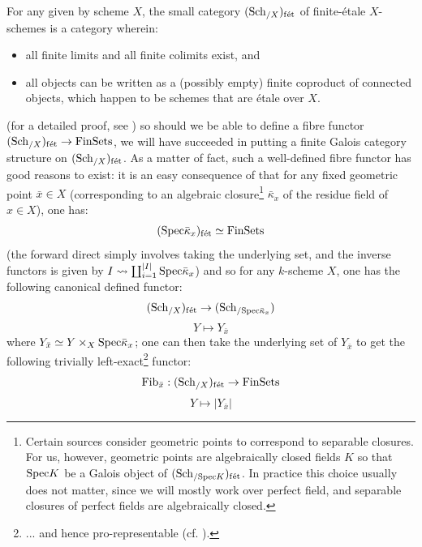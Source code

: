             \begin{remark} \label{remark: finite_etale_schemes}
                For any given by scheme $X$, the small category $(\mathrm{Sch}_{/X})_{\mathrm{f\acute{e}t}}$ of finite-\'etale $X$-schemes is a category wherein:
                    \begin{itemize}
                        \item all finite limits and all finite colimits exist, and
                        \item all objects can be written as a (possibly empty) finite coproduct of connected objects, which happen to be schemes that are \'etale over $X$.  
                    \end{itemize}
                (for a detailed proof, see \cite[\href{https://stacks.math.columbia.edu/tag/0BN9}{Tag 0BN9}]{stacks}) so should we be able to define a fibre functor $(\mathrm{Sch}_{/X})_{\mathrm{f\acute{e}t}} \to \mathrm{Fin}\mathrm{Sets}$, we will have succeeded in putting a finite Galois category structure on $(\mathrm{Sch}_{/X})_{\mathrm{f\acute{e}t}}$. As a matter of fact, such a well-defined fibre functor has good reasons to exist: it is an easy consequence of \cite[\href{https://stacks.math.columbia.edu/tag/00U3}{Tag 00U3}]{stacks} that for any fixed geometric point $\bar{x} \in X$ (corresponding to an algebraic closure\footnote{Certain sources consider geometric points to correspond to separable closures. For us, however, geometric points are algebraically closed fields $K$ so that $\mathrm{Spec} K$ be a Galois object of $(\mathrm{Sch}_{/\mathrm{Spec} K})_{\mathrm{f\acute{e}t}}$. In practice this choice usually does not matter, since we will mostly work over perfect field, and separable closures of perfect fields are algebraically closed.} $\bar{\kappa}_x$ of the residue field of $x \in X$), one has:
                    $$(\mathrm{Spec} \bar{\kappa}_x)_{\mathrm{f\acute{e}t}} \simeq \mathrm{Fin}\mathrm{Sets}$$
                (the forward direct simply involves taking the underlying set, and the inverse functors is given by $I \leadsto \coprod_{i = 1}^{|I|} \mathrm{Spec} \bar{\kappa}_x$) and so for any $k$-scheme $X$, one has the following canonical defined functor:
                    $$(\mathrm{Sch}_{/X})_{\mathrm{f\acute{e}t}} \to (\mathrm{Sch}_{/\mathrm{Spec} \bar{\kappa}_x})$$
                    $$Y \mapsto Y_{\bar{x}}$$
                where $Y_{\bar{x}} \cong Y \x_X \Spec \bar{\kappa}_x$; one can then take the underlying set of $Y_{\bar{x}}$ to get the following trivially left-exact\footnote{... and hence pro-representable (cf. \cite[Proposition 3.1]{grothendieck_fga_2}).} functor:
                    $$\mathrm{Fib}_{\bar{x}}: (\mathrm{Sch}_{/X})_{\mathrm{f\acute{e}t}} \to \mathrm{Fin}\mathrm{Sets}$$
                    $$Y \mapsto |Y_{\bar{x}}|$$

\end{remark}
